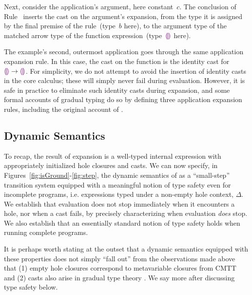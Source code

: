 Next, consider the application's argument, here constant~$c$.
%
The conclusion of Rule~ inserts the cast on the argument's
expansion, from the type it is assigned by the final premise of the
rule~(type~$b$ here), to the argument type of the matched arrow type
of the function expression~(type~$\textcolor{violet}{\llparenthesis}\textcolor{violet}{\rrparenthesis}$ here).

The example's second, outermost application goes through the same
application expansion rule.
%
In this case, the cast on the function is the identity cast for
$\textcolor{violet}{\llparenthesis}\textcolor{violet}{\rrparenthesis} \rightarrow \textcolor{violet}{\llparenthesis}\textcolor{violet}{\rrparenthesis}$.
%
For simplicity, we do not attempt to avoid the insertion of identity
casts in the core calculus; these will simply never fail during
evaluation.
%
However, it is safe in practice to eliminate such identity casts during expansion,
and some formal accounts of gradual typing do so by defining three
application expansion rules, including the original account of \citet{Siek06a}.

\subsection{Dynamic Semantics}
\label{sec:evaluation}

To recap, the result of expansion is a well-typed internal expression with appropriately initialized hole closures and casts. 
We can now specify, in Figures~\ref{fig:isGround}-\ref{fig:step}, the dynamic semantics of \HazelnutLive as a ``small-step'' transition system equipped with a meaningful notion of type safety even for incomplete programs, i.e. expressions typed under a non-empty hole context, $\Delta$. 
We establish that evaluation does not stop immediately when it encounters a hole, nor when a cast fails, by precisely characterizing when evaluation \emph{does} stop. 
We also establish that an essentially standard notion of type safety holds when running complete programs. 

It is perhaps worth stating at the outset that a dynamic semantics equipped with these properties does not simply ``fall out'' from the observations made above that (1) empty hole closures correspond to metavariable closures from CMTT \cite{Nanevski2008} and (2) casts also arise in gradual type theory \cite{DBLP:conf/snapl/SiekVCB15}. 
%
We say more after discussing type safety below.
%








